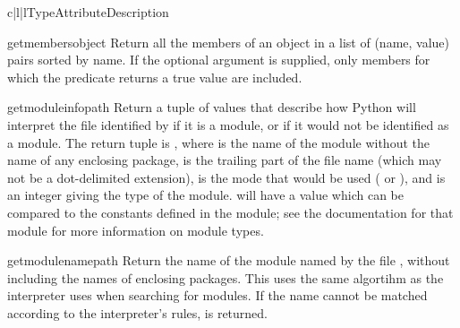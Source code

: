 \begin{tableiii}{c|l|l}{}{Type}{Attribute}{Description}
  \hline
\end{tableiii}

\begin{funcdesc}{getmembers}{object}
  Return all the members of an object in a list of (name, value) pairs
  sorted by name.  If the optional  argument is supplied,
  only members for which the predicate returns a true value are included.
\end{funcdesc}

\begin{funcdesc}{getmoduleinfo}{path}
  Return a tuple of values that describe how Python will interpret the
  file identified by  if it is a module, or  if
  it would not be identified as a module.  The return tuple is
  , where
   is the name of the module without the name of any
  enclosing package,  is the trailing part of the file
  name (which may not be a dot-delimited extension),  is the
   mode that would be used ( or
  ), and  is an integer giving the type of the
  module.   will have a value which can be compared to the
  constants defined in the  module; see the
  documentation for that module for more information on module types.
\end{funcdesc}

\begin{funcdesc}{getmodulename}{path}
  Return the name of the module named by the file , without
  including the names of enclosing packages.  This uses the same
  algortihm as the interpreter uses when searching for modules.  If
  the name cannot be matched according to the interpreter's rules,
   is returned.
\end{funcdesc}

